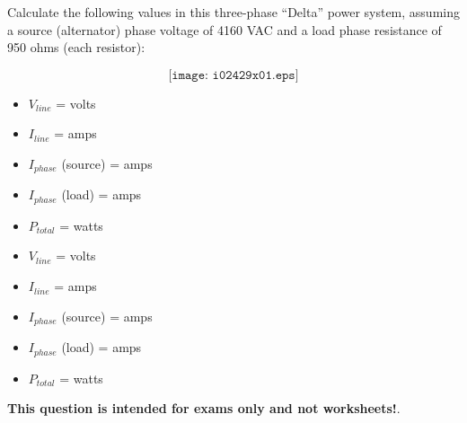

Calculate the following values in this three-phase ``Delta'' power system, assuming a source (alternator) phase voltage of 4160 VAC and a load phase resistance of 950 ohms (each resistor):

$$\texttt{[image: i02429x01.eps]}$$

\begin{itemize}
\item{} $V_{line}$ = \underbar{\hskip 50pt} volts
\vskip 10pt
\item{} $I_{line}$ = \underbar{\hskip 50pt} amps
\vskip 10pt
\item{} $I_{phase}$ (source) = \underbar{\hskip 50pt} amps
\vskip 10pt
\item{} $I_{phase}$ (load) = \underbar{\hskip 50pt} amps
\vskip 10pt
\item{} $P_{total}$ = \underbar{\hskip 50pt} watts  
\end{itemize}







\begin{itemize}
\item{} $V_{line}$ =  volts
\vskip 10pt
\item{} $I_{line}$ =  amps
\vskip 10pt
\item{} $I_{phase}$ (source) =  amps
\vskip 10pt
\item{} $I_{phase}$ (load) =  amps
\vskip 10pt
\item{} $P_{total}$ =  watts  
\end{itemize}








{\bf This question is intended for exams only and not worksheets!}.


